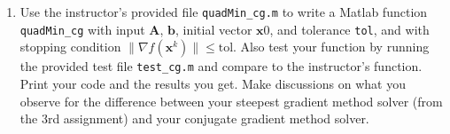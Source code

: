 \documentclass[12pt]{article}
\newcommand{\vb}{{\mathbf{b}}}
\newcommand{\vx}{{\mathbf{x}}}
\newcommand{\vA}{{\mathbf{A}}}
\begin{document}
\begin{enumerate}
\[x^{(3)} = x^{(2)} + \alpha^{(2)}p^{(2)} = \begin{bmatrix}
\frac{10}{11} \\
\frac{5}{11}
\end{bmatrix} + \frac{11}{40} \begin{bmatrix}
\frac{40}{121} \\
\frac{240}{121}
\end{bmatrix} = \begin{bmatrix}
1 \\
1
\end{bmatrix}\]

\[ r^{(3)} = Ax^{(3)} - b = \begin{bmatrix}
4 & -2 \\
-2 & 3
\end{bmatrix}\begin{bmatrix}
1 \\
1
\end{bmatrix} - \begin{bmatrix}
2 \\
1
\end{bmatrix} = \begin{bmatrix}
0 \\
0
\end{bmatrix}\]

Thus, we have $r^{(3)} = \begin{bmatrix}
0 \\
0
\end{bmatrix}$, so we have found the exact solution and we stop iterating. We get the exact solution of $x^{(3)} = \begin{bmatrix}
1 \\
1
\end{bmatrix}$


\newpage

\item Use the instructor's provided file \verb|quadMin_cg.m| to write a Matlab function \verb|quadMin_cg| with input $\vA$, $\vb$, initial vector $\vx0$, and tolerance \verb|tol|, and with stopping condition $\|\nabla f(\vx^k)\| \le \text{tol}$. Also test your function by running the provided test file \verb|test_cg.m| and compare to the instructor's function. Print your code and the results you get. Make discussions on what you observe for the difference between your steepest gradient method solver (from the 3rd assignment) and your conjugate gradient method solver.
\end{enumerate}

\vspace{8mm}
\end{document}
